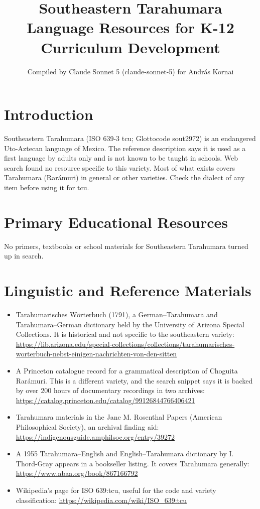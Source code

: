 \documentclass[12pt]{article}
\title{Southeastern Tarahumara Language Resources for K-12 Curriculum Development}
\author{Compiled by Claude Sonnet 5 (claude-sonnet-5) for Andr\'as Kornai}
\date{}
\begin{document}
\maketitle

\section{Introduction}
Southeastern Tarahumara (ISO 639-3 tcu; Glottocode sout2972) is an endangered Uto-Aztecan language of Mexico. The reference description says it is used as a first language by adults only and is not known to be taught in schools. Web search found no resource specific to this variety. Most of what exists covers Tarahumara (Rar\'amuri) in general or other varieties. Check the dialect of any item before using it for tcu.

\section{Primary Educational Resources}
No primers, textbooks or school materials for Southeastern Tarahumara turned up in search.

\section{Linguistic and Reference Materials}
\begin{itemize}
\item Tarahumarisches W\"orterbuch (1791), a German--Tarahumara and Tarahumara--German dictionary held by the University of Arizona Special Collections. It is historical and not specific to the southeastern variety: \url{https://lib.arizona.edu/special-collections/collections/tarahumarisches-worterbuch-nebst-einigen-nachrichten-von-den-sitten}
\item A Princeton catalogue record for a grammatical description of Choguita Rar\'amuri. This is a different variety, and the search snippet says it is backed by over 200 hours of documentary recordings in two archives: \url{https://catalog.princeton.edu/catalog/99126844766406421}
\item Tarahumara materials in the Jane M. Rosenthal Papers (American Philosophical Society), an archival finding aid: \url{https://indigenousguide.amphilsoc.org/entry/39272}
\item A 1955 Tarahumara--English and English--Tarahumara dictionary by I. Thord-Gray appears in a bookseller listing. It covers Tarahumara generally: \url{https://www.abaa.org/book/867166792}
\item Wikipedia's page for ISO 639:tcu, useful for the code and variety classification: \url{https://wikipedia.com/wiki/ISO_639:tcu}
\end{itemize}
\end{document}
